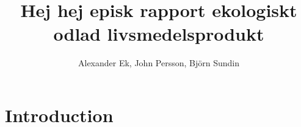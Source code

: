 \documentclass[12pt, titlepage, parskip=full*]{scrartcl}
\title{Hej hej episk rapport ekologiskt odlad livsmedelsprodukt}
\author{Alexander Ek, John Persson, Björn Sundin}
\begin{document}
\maketitle

\tableofcontents

\section{Introduction}
\end{document}
